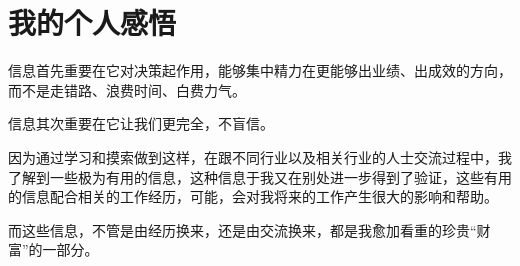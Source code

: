 \documentclass[UTF8,a4paper,10pt]{ctexart}
\begin{document}
\section{我的个人感悟}
信息首先重要在它对决策起作用，能够集中精力在更能够出业绩、出成效的方向，而不是走错路、浪费时间、白费力气。

信息其次重要在它让我们更完全，不盲信。\par
因为通过学习和摸索做到这样，在跟不同行业以及相关行业的人士交流过程中，我了解到一些极为有用的信息，这种信息于我又在别处进一步得到了验证，这些有用的信息配合相关的工作经历，可能，会对我将来的工作产生很大的影响和帮助。\par

而这些信息，不管是由经历换来，还是由交流换来，都是我愈加看重的珍贵“财富”的一部分。\par


\end{document}
